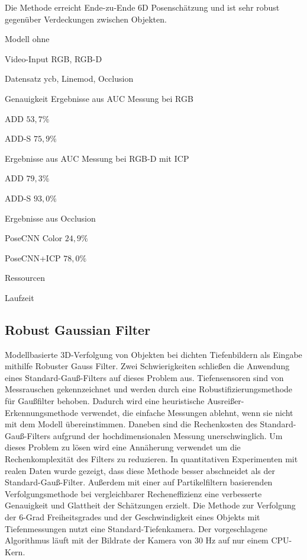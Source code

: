 \documentclass[a4paper, 11pt]{article}
\begin{document}
\begin{multicols*}{2}
    Die Methode erreicht Ende-zu-Ende 6D Posenschätzung und ist sehr robust gegenüber Verdeckungen zwischen Objekten.
    \begin{description*}
        \item[Modell] ohne
        \item[Video-Input] RGB, RGB-D
        \item[Datensatz] \Gls{ycb}, \Gls{Linemod}, \Gls{Occlusion}
        \item[Genauigkeit] Ergebnisse aus \Gls{AUC} Messung bei RGB
        \begin{itemize*}
            \item ADD $53,7\%$
            \item ADD-S $75,9\%$
        \end{itemize*}
        Ergebnisse aus \Gls{AUC} Messung bei RGB-D mit ICP
        \begin{itemize*}
            \item ADD $79,3\%$
            \item ADD-S $93,0\%$
        \end{itemize*}
        Ergebnisse aus \Gls{Occlusion}
        \begin{itemize*}
            \item PoseCNN Color $24,9\%$
            \item PoseCNN+ICP $78,0\%$
        \end{itemize*}
        \item[Ressourcen]
        \item[Laufzeit]
    \end{description*}


    \subsection{Robust Gaussian Filter}
    Modellbasierte 3D-Verfolgung von Objekten bei dichten Tiefenbildern als Eingabe mithilfe Robuster Gauss Filter\cite{GaussianFilter}.
    Zwei Schwierigkeiten schließen die Anwendung eines Standard-Gauß-Filters auf dieses Problem aus. Tiefensensoren sind von Messrauschen gekennzeichnet und werden durch eine Robustifizierungsmethode für Gaußfilter behoben. Dadurch wird eine heuristische Ausreißer-Erkennungsmethode verwendet, die einfache Messungen ablehnt, wenn sie nicht mit dem Modell übereinstimmen.
    Daneben sind die Rechenkosten des Standard-Gauß-Filters aufgrund der hochdimensionalen Messung unerschwinglich. Um dieses Problem zu lösen wird eine Annäherung verwendet um die Rechenkomplexität des Filters zu reduzieren.
    In quantitativen Experimenten mit realen Daten wurde gezeigt, dass diese Methode besser abschneidet als der Standard-Gauß-Filter. Außerdem mit einer auf Partikelfiltern basierenden Verfolgungsmethode bei vergleichbarer Recheneffizienz eine verbesserte Genauigkeit und Glattheit der Schätzungen erzielt.
    Die Methode zur Verfolgung der 6-Grad Freiheitsgrades und der Geschwindigkeit eines Objekts mit Tiefenmessungen nutzt eine Standard-Tiefenkamera. Der vorgeschlagene Algorithmus läuft mit der Bildrate der Kamera von 30 Hz auf nur einem CPU-Kern.


\end{multicols*}
\end{document}
